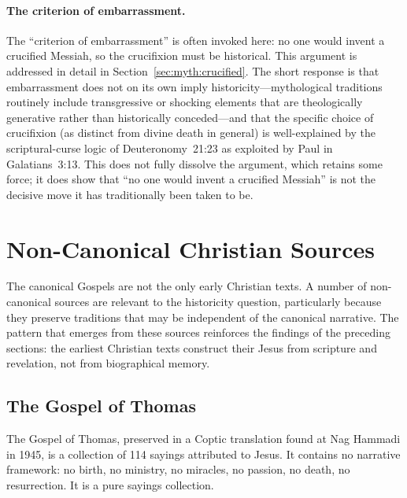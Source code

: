 \documentclass[12pt,oneside]{article}
\begin{document}
\paragraph{The criterion of embarrassment.}
The ``criterion of embarrassment'' is often invoked here: no one
would invent a crucified Messiah, so the crucifixion must be
historical.  This argument is addressed in detail in
Section~\ref{sec:myth:crucified}.  The short response is that
embarrassment does not on its own imply historicity---mythological
traditions routinely include transgressive or shocking elements that
are theologically generative rather than historically conceded---and
that the specific choice of crucifixion (as distinct from divine death
in general) is well-explained by the scriptural-curse logic of
Deuteronomy~21:23 as exploited by Paul in Galatians~3:13.  This does
not fully dissolve the argument, which retains some force; it does
show that ``no one would invent a crucified Messiah'' is not the
decisive move it has traditionally been taken to be.


\section{Non-Canonical Christian Sources}
\label{sec:noncanon}

The canonical Gospels are not the only early Christian texts.  A number
of non-canonical sources are relevant to the historicity question,
particularly because they preserve traditions that may be independent of
the canonical narrative.  The pattern that emerges from these sources
reinforces the findings of the preceding sections: the earliest
Christian texts construct their Jesus from scripture and revelation, not
from biographical memory.

\subsection{The Gospel of Thomas}
\label{sec:noncanon:thomas}

The Gospel of Thomas, preserved in a Coptic translation found at
Nag Hammadi in 1945, is a collection of 114 sayings attributed to
Jesus.  It contains no narrative framework: no birth, no ministry, no
miracles, no passion, no death, no resurrection.  It is a pure sayings
collection.
\end{document}
